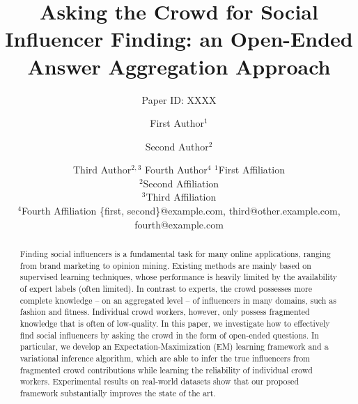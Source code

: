 \documentclass{article}
\title{Asking the Crowd for Social Influencer Finding: an Open-Ended Answer Aggregation Approach}
\author{
Paper ID: XXXX
}
\author{
First Author$^1$
\and
Second Author$^2$\and
Third Author$^{2,3}$\And
Fourth Author$^4$
\affiliations
$^1$First Affiliation\\
$^2$Second Affiliation\\
$^3$Third Affiliation\\
$^4$Fourth Affiliation
\emails
\{first, second\}@example.com,
third@other.example.com,
fourth@example.com
}
\begin{document}
\maketitle

\begin{abstract}
Finding social influencers is a fundamental task for many online applications, ranging from brand marketing to opinion mining. Existing methods are mainly based on supervised  learning techniques, whose performance is heavily limited by the availability of expert labels (often limited). In contrast to experts, the crowd possesses more complete knowledge -- on an aggregated level -- of influencers in many domains, such as fashion and fitness. Individual crowd workers, however, only possess fragmented knowledge that is often of low-quality. In this paper, we investigate how to effectively find social influencers by asking the crowd in the form of open-ended questions. In particular, we develop an Expectation-Maximization (EM) learning framework and a variational inference algorithm, which are able to infer the true influencers from fragmented crowd contributions while learning the reliability of individual crowd workers. Experimental results on real-world datasets show that our proposed framework substantially improves the state of the art. 
\end{abstract}
\end{document}
